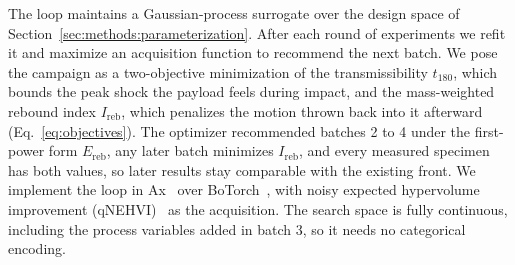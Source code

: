 \documentclass[11pt]{article}
\begin{document}
The loop maintains a Gaussian-process surrogate over the design space of
Section~\ref{sec:methods:parameterization}. After each round of
experiments we refit it and maximize an acquisition function to
recommend the next batch. We pose the campaign as a two-objective
minimization of the transmissibility $t_{180}$, which bounds the peak
shock the payload feels during impact, and the mass-weighted rebound
index $I_{\mathrm{reb}}$, which penalizes the motion thrown back into it
afterward (Eq.~\eqref{eq:objectives}). The optimizer recommended batches
2 to 4 under the first-power form $E_{\mathrm{reb}}$, any later batch
minimizes $I_{\mathrm{reb}}$, and every measured specimen has both
values, so later results stay comparable with the existing front. We
implement the loop in Ax~\citep{pmlr-v293-olson25a} over
BoTorch~\citep{balandat2020botorch}, with noisy expected hypervolume
improvement (qNEHVI)~\citep{daulton2021nehvi} as the acquisition. The
search space is fully continuous, including the process variables added
in batch 3, so it needs no categorical encoding.
\end{document}
